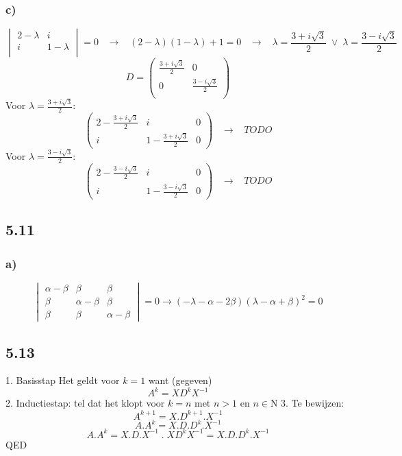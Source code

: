 \documentclass[11pt]{article}
\begin{document}
\subsubsection*{c)}
\[
\begin{vmatrix}
2-\lambda & i\\
i & 1- \lambda \\
\end{vmatrix}
=0
\;\;\;\longrightarrow\;\;\;
(2-\lambda)(1-\lambda)+1=0
\;\;\;\longrightarrow\;\;\;
\lambda = \frac{3+i\sqrt{3}}{2} \;\vee\; \lambda = \frac{3-i\sqrt{3}}{2}
\]
\[
D = 
\begin{pmatrix}
\frac{3+i\sqrt{3}}{2} & 0\\
0 & \frac{3-i\sqrt{3}}{2}\\
\end{pmatrix}
\]
Voor $\lambda = \frac{3+i\sqrt{3}}{2}$: 
\[
\left(
\begin{array}{cc|c}
2-\frac{3+i\sqrt{3}}{2} & i & 0 \\
i & 1-\frac{3+i\sqrt{3}}{2} & 0
\end{array}
\right)
\;\;\;\longrightarrow\;\;\;
TODO
\]
Voor $\lambda = \frac{3-i\sqrt{3}}{2}$: 
\[
\left(
\begin{array}{cc|c}
2-\frac{3-i\sqrt{3}}{2} & i & 0 \\
i & 1-\frac{3-i\sqrt{3}}{2} & 0
\end{array}
\right)
\;\;\;\longrightarrow\;\;\;
TODO
\]

\subsection*{5.11}
\subsubsection*{a)}
\[
\begin{vmatrix}
\alpha-\beta & \beta & \beta \\
\beta & \alpha-\beta & \beta \\
\beta & \beta & \alpha-\beta
\end{vmatrix}
=0
\longrightarrow
(-\lambda-\alpha-2\beta)(\lambda-\alpha+\beta)^2 = 0
\]

\subsection*{5.13}
1. Basisstap
Het geldt voor $k=1$ want (gegeven)
\[
A^k = XD^kX^{-1}
\]
2. Inductiestap: tel dat het klopt voor $k=n$ met $n>1$ en $n \in \mathrm{N}$
3. Te bewijzen: 
\[
A^{k+1} = X.D^{k+1}.X^{-1}
\]
\[
A.A^k = X.D.D^k.X^{-1}
\]
\[
A.A^k = X.D.X^{-1}\;.\;XD^kX^{-1} = X.D.D^k.X^{-1}
\]
QED
\end{document}
